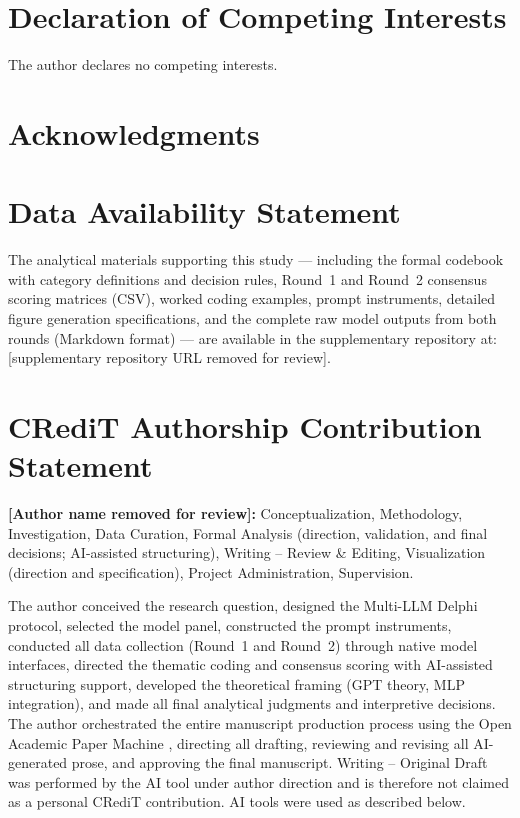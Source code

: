 \documentclass[preprint,review,12pt]{elsarticle}
\begin{document}
\section*{Declaration of Competing Interests}

The author declares no competing interests.

\section*{Acknowledgments}

\section*{Data Availability Statement}

The analytical materials supporting this study --- including the formal codebook with category definitions and decision rules, Round~1 and Round~2 consensus scoring matrices (CSV), worked coding examples, prompt instruments, detailed figure generation specifications, and the complete raw model outputs from both rounds (Markdown format) --- are available in the supplementary repository at: [supplementary repository URL removed for review].

\section*{CRediT Authorship Contribution Statement}

\textbf{[Author name removed for review]:} Conceptualization, Methodology, Investigation, Data Curation, Formal Analysis (direction, validation, and final decisions; AI-assisted structuring), Writing -- Review \& Editing, Visualization (direction and specification), Project Administration, Supervision.

The author conceived the research question, designed the Multi-LLM Delphi protocol, selected the model panel, constructed the prompt instruments, conducted all data collection (Round~1 and Round~2) through native model interfaces, directed the thematic coding and consensus scoring with AI-assisted structuring support, developed the theoretical framing (GPT theory, MLP integration), and made all final analytical judgments and interpretive decisions. The author orchestrated the entire manuscript production process using the Open Academic Paper Machine \citep{anonymized2026openpapermachine}, directing all drafting, reviewing and revising all AI-generated prose, and approving the final manuscript. Writing -- Original Draft was performed by the AI tool under author direction and is therefore not claimed as a personal CRediT contribution. AI tools were used as described below.
\end{document}
